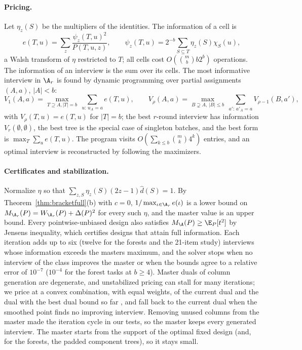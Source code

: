 \paragraph{Pricing.}
Let $\eta_z(S)$ be the multipliers of the identities. The information of a cell is
\[
 e(T,u)=\sum_z\frac{\psi_z(T,u)^2}{P(T,u,z)},\qquad \psi_z(T,u)=2^{-b}\sum_{S\subseteq T}\eta_z(S)\chi_S(u),
\]
a Walsh transform of $\eta$ restricted to $T$; all cells cost $O(\binom mbb2^b)$ operations. The information of an interview is the sum over its cells. The most informative interview in $\A_r$ is found by dynamic programming over partial assignments $(A,a)$, $|A|<b$:
\[
 V_1(A,a)=\max_{T\supseteq A,|T|=b}\ \sum_{u:\,u_A=a}e(T,u),\qquad
 V_\rho(A,a)=\max_{B\supsetneq A,\,|B|\le b}\ \sum_{a':\,a'_A=a}V_{\rho-1}(B,a'),
\]
with $V_\rho(T,u)=e(T,u)$ for $|T|=b$; the best $r$-round interview has information $V_r(\emptyset,\emptyset)$, the best tree is the special case of singleton batches, and the best form is $\max_T\sum_ue(T,u)$. The program visits $O(\sum_{k\le b}\binom mk4^k)$ entries, and an optimal interview is reconstructed by following the maximizers.

\paragraph{Certificates and stabilization.}
Normalize $\eta$ so that $\sum_{z,S}\eta_z(S)(2z-1)\widehat d(S)=1$. By Theorem~\ref{thm:bracketfull}(b) with $c=0$, $1/\max_{\iota\in\A_r}e(\iota)$ is a lower bound on $M_{\A_r}(P)=W_{\A_r}(P)+\Delta(P)^2$ for every such $\eta$, and the master value is an upper bound. Every pointwise-unbiased design also satisfies $M_\A(P)\ge\E_P[t^2]$ by Jensen\textquotesingle s inequality, which certifies designs that attain full information. Each iteration adds up to six (twelve for the forests and the 21-item study) interviews whose information exceeds the master\textquotesingle s maximum, and the solver stops when no interview of the class improves the master or when the bounds agree to a relative error of $10^{-7}$ ($10^{-4}$ for the forest tasks at $b\ge4$). Master duals of column generation are degenerate, and unstabilized pricing can stall for many iterations; we price at a convex combination, with equal weights, of the current dual and the dual with the best dual bound so far \citep{wentges1997}, and fall back to the current dual when the smoothed point finds no improving interview. Removing unused columns from the master made the iteration cycle in our tests, so the master keeps every generated interview. The master starts from the support of the optimal fixed design (and, for the forests, the padded component trees), so it stays small.

